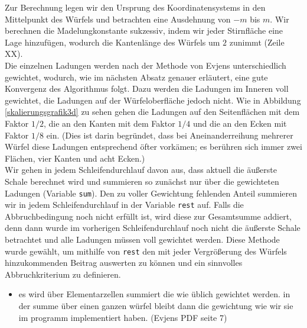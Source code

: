 \documentclass[10pt,a4paper]{article}
\begin{document}
Zur Berechnung legen wir den Ursprung des Koordinatensystems in den Mittelpunkt des
Würfels und betrachten eine Ausdehnung von $-m$ bis $m$.
Wir berechnen die Madelungkonstante sukzessiv, indem wir jeder Stirnfläche eine Lage
hinzufügen, wodurch die Kantenlänge des Würfels um $2$ zunimmt (Zeile XX).\\
Die einzelnen Ladungen werden nach der Methode von
Evjens \cite{Evjen} unterschiedlich gewichtet, wodurch, wie im nächsten Absatz genauer
erläutert, eine gute Konvergenz des Algorithmus folgt. Dazu werden die Ladungen im
Inneren voll gewichtet, die Ladungen auf der Würfeloberfläche jedoch nicht. Wie in
Abbildung \ref{skalierungsgrafik3d} zu sehen gehen die Ladungen auf den Seitenflächen mit
dem Faktor $1/2$, die an den Kanten mit dem Faktor $1/4$ und die an den Ecken mit Faktor
$1/8$ ein. (Dies ist darin begründet, dass bei Aneinanderreihung mehrerer Würfel diese
Ladungen entsprechend öfter vorkämen; es berühren sich immer zwei Flächen, vier Kanten
und acht Ecken.)\\
Wir gehen in jedem Schleifendurchlauf davon aus, dass aktuell die äußerste Schale berechnet
wird und summieren so zunächst nur über die gewichteten Ladungen (Variable \texttt{sum}).
Den zu voller Gewichtung fehlenden Anteil summieren wir in jedem Schleifendurchlauf in der Variable
\texttt{rest} auf. Falls die Abbruchbedingung noch nicht erfüllt ist, wird diese zur
Gesamtsumme addiert, denn dann wurde im vorherigen Schleifendurchlauf noch nicht die
äußerste Schale betrachtet und alle Ladungen müssen voll gewichtet werden. Diese Methode
wurde gewählt, um mithilfe von \texttt{rest} den mit jeder Vergrößerung des Würfels
hinzukommenden Beitrag auswerten zu können und ein sinnvolles Abbruchkriterium zu definieren.

\begin{itemize}
\item es wird über Elementarzellen summiert die wie üblich gewichtet werden. in
der summe über einen ganzen würfel bleibt dann die gewichtung wie wir sie im
programm implementiert haben. (Evjens PDF seite 7)
\end{itemize}
\end{document}
